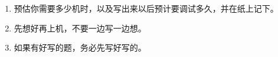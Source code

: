 \begin{enumerate}
    \item 预估你需要多少机时，以及写出来以后预计要调试多久，并在纸上记下。
    \item 先想好再上机，不要一边写一边想。
    \item 如果有好写的题，务必先写好写的。
\end{enumerate}